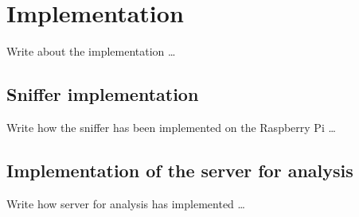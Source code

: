 \chapter{Implementation}
\label{cha:implementation}
\vspace{0.5 cm} 

Write about the implementation \dots


\vspace{0.5 cm} 
\section{Sniffer implementation}
\label{sec:sniffer}
\vspace{0.5 cm} 

Write how the sniffer has been implemented on the Raspberry Pi \dots


\vspace{0.5 cm} 
\section{Implementation of the server for analysis}
\label{sec:implser}
\vspace{0.5 cm} 

Write how server for analysis has implemented \dots
